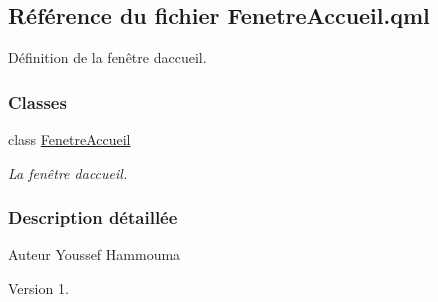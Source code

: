 \hypertarget{_fenetre_accueil_8qml}{}\subsection{Référence du fichier Fenetre\+Accueil.\+qml}
\label{_fenetre_accueil_8qml}


Définition de la fenêtre d\textquotesingle{}accueil.  


\subsubsection*{Classes}
\begin{DoxyCompactItemize}
\item 
class \hyperlink{class_fenetre_accueil}{Fenetre\+Accueil}
\begin{DoxyCompactList}\small\item\em La fenêtre d\textquotesingle{}accueil. \end{DoxyCompactList}\end{DoxyCompactItemize}


\subsubsection{Description détaillée}
\begin{DoxyAuthor}{Auteur}
Youssef Hammouma
\end{DoxyAuthor}
\begin{DoxyVersion}{Version}
1. 
\end{DoxyVersion}
